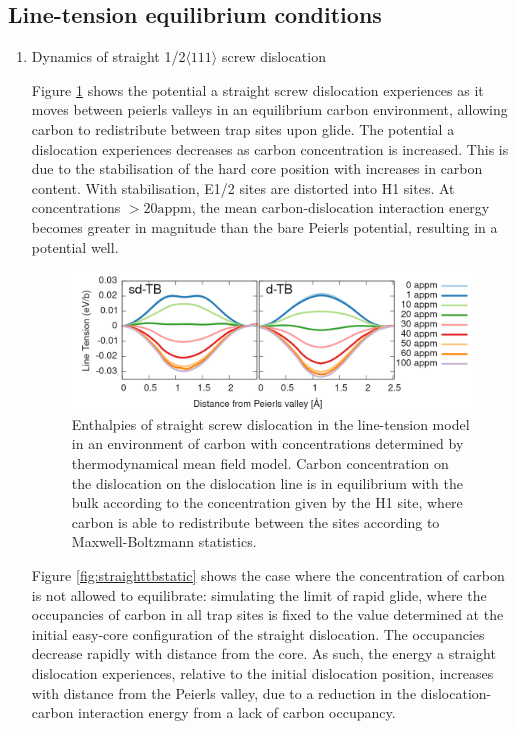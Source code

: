 \documentclass[a4paper,12pt,oneside,print,numbered,index,PageStyleIII]{PhDThesisPSnPDF}
\begin{document}
\subsection{Line-tension equilibrium conditions}
\label{sec:org35b187b}

\begin{enumerate}
\item Dynamics of straight 1/2\(\langle 111 \rangle\) screw dislocation
\label{sec:org372d820}

Figure \ref{fig:straighttbequib} shows the potential a straight screw
dislocation experiences as it moves between peierls valleys in an
equilibrium carbon environment, allowing carbon to redistribute between trap
sites upon glide. The potential a dislocation experiences decreases as
carbon concentration is increased. This is due to the stabilisation of the
hard core position with increases in carbon content. With stabilisation,
E1/2 sites are distorted into H1 sites. At concentrations \(\gt
     20\text{appm}\), the mean carbon-dislocation interaction energy becomes
greater in magnitude than the bare Peierls potential, resulting in a
potential well.


\begin{figure}[htbp]
\centering
\includegraphics[width=.9\linewidth]{iron/Images/straight_line_enthalpies_equib_both.png}
\caption{Enthalpies of straight screw dislocation in the line-tension model in an environment of carbon with concentrations determined by thermodynamical mean field model. Carbon concentration on the dislocation on the dislocation line is in equilibrium with the bulk according to the concentration given by the H1 site, where carbon is able to redistribute between the sites according to Maxwell-Boltzmann statistics. \label{fig:straighttbequib}}
\end{figure}



Figure \ref{fig:straighttbstatic} shows the case where the concentration of
carbon is not allowed to equilibrate: simulating the limit of rapid glide,
where the occupancies of carbon in all trap sites is fixed to the value
determined at the initial easy-core configuration of the straight
dislocation. The occupancies decrease rapidly with distance from the
core. As such, the energy a straight dislocation experiences, relative to the initial
dislocation position, increases with
distance from the Peierls valley, due to a reduction in the
dislocation-carbon interaction energy from a lack of carbon occupancy.



\end{enumerate}
\end{document}
